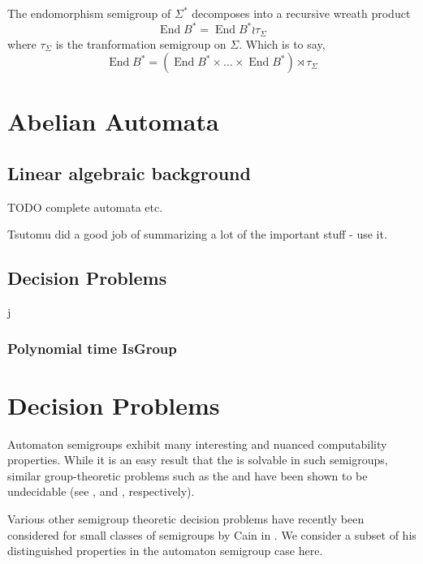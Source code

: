 \documentclass[11pt]{article}
\begin{document}
The endomorphism semigroup of $\Sigma^*$ decomposes into a recursive
wreath product
\[
  \operatorname{End}B^* = \operatorname{End}B^* \wr \tau_\Sigma
\]
where $\tau_\Sigma$ is the tranformation semigroup on $\Sigma$. Which
is to say,
\[
  \operatorname{End}B^* = (\operatorname{End}B^* \times \ldots \times
  \operatorname{End}B^* ) \rtimes \tau_\Sigma
\]



\section{Abelian Automata}

\subsection{Linear algebraic background}
TODO complete automata etc.

Tsutomu did a good job of summarizing a lot of the important stuff -
use it.

\subsection{Decision Problems}j

\subsubsection{Polynomial time IsGroup}

\section{Decision Problems}

Automaton semigroups exhibit many interesting and nuanced
computability properties. While it is an easy result that the
 is solvable in such semigroups, similar
group-theoretic problems such as the  and
 have been shown to be undecidable
(see \cite{sunic:conj}, and \cite{gillibert:finite}, respectively).

Various other semigroup theoretic decision problems have recently been
considered for small classes of semigroups by Cain in
\cite{Cain09:dec_prob}. We consider a subset of his distinguished
properties in the automaton semigroup case here.
\end{document}
